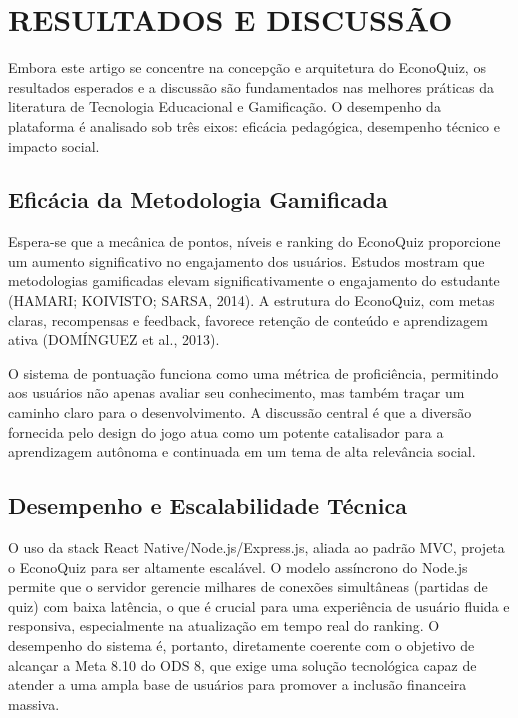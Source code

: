 \documentclass[12pt,a4paper]{article}
\begin{document}
\section{RESULTADOS E DISCUSSÃO}

Embora este artigo se concentre na concepção e arquitetura do EconoQuiz, os resultados esperados e a discussão são fundamentados nas melhores práticas da literatura de Tecnologia Educacional e Gamificação. O desempenho da plataforma é analisado sob três eixos: eficácia pedagógica, desempenho técnico e impacto social.

\subsection{Eficácia da Metodologia Gamificada}

Espera-se que a mecânica de pontos, níveis e ranking do EconoQuiz proporcione um aumento significativo no engajamento dos usuários. Estudos mostram que metodologias gamificadas elevam significativamente o engajamento do estudante (HAMARI; KOIVISTO; SARSA, 2014). A estrutura do EconoQuiz, com metas claras, recompensas e feedback, favorece retenção de conteúdo e aprendizagem ativa (DOMÍNGUEZ et al., 2013).

O sistema de pontuação funciona como uma métrica de proficiência, permitindo aos usuários não apenas avaliar seu conhecimento, mas também traçar um caminho claro para o desenvolvimento. A discussão central é que a diversão fornecida pelo design do jogo atua como um potente catalisador para a aprendizagem autônoma e continuada em um tema de alta relevância social.

\subsection{Desempenho e Escalabilidade Técnica}

O uso da stack React Native/Node.js/Express.js, aliada ao padrão MVC, projeta o EconoQuiz para ser altamente escalável. O modelo assíncrono do Node.js permite que o servidor gerencie milhares de conexões simultâneas (partidas de quiz) com baixa latência, o que é crucial para uma experiência de usuário fluida e responsiva, especialmente na atualização em tempo real do ranking. O desempenho do sistema é, portanto, diretamente coerente com o objetivo de alcançar a Meta 8.10 do ODS 8, que exige uma solução tecnológica capaz de atender a uma ampla base de usuários para promover a inclusão financeira massiva.
\end{document}
